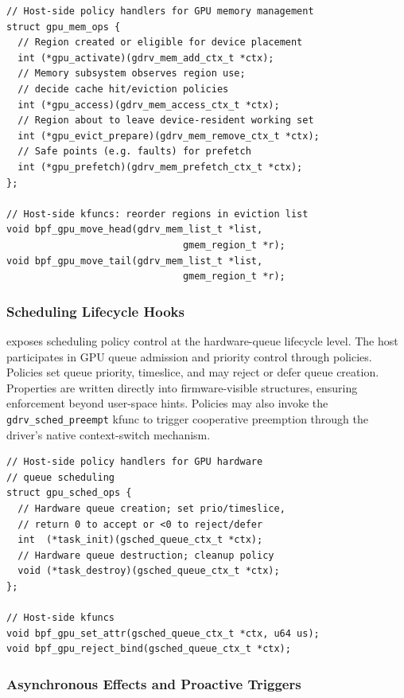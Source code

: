 \begin{lstlisting}
// Host-side policy handlers for GPU memory management
struct gpu_mem_ops {
  // Region created or eligible for device placement
  int (*gpu_activate)(gdrv_mem_add_ctx_t *ctx);
  // Memory subsystem observes region use;
  // decide cache hit/eviction policies
  int (*gpu_access)(gdrv_mem_access_ctx_t *ctx);
  // Region about to leave device-resident working set
  int (*gpu_evict_prepare)(gdrv_mem_remove_ctx_t *ctx);
  // Safe points (e.g. faults) for prefetch
  int (*gpu_prefetch)(gdrv_mem_prefetch_ctx_t *ctx);
};

// Host-side kfuncs: reorder regions in eviction list
void bpf_gpu_move_head(gdrv_mem_list_t *list,
                               gmem_region_t *r);
void bpf_gpu_move_tail(gdrv_mem_list_t *list,
                               gmem_region_t *r);
\end{lstlisting}

\subsubsection{Scheduling Lifecycle Hooks}
\label{sec:design-sched}

\sys exposes scheduling policy control at the hardware-queue lifecycle level. The host participates in GPU queue admission and priority control through policies. Policies set queue priority, timeslice, and may reject or defer queue creation. Properties are written directly into firmware-visible structures, ensuring enforcement beyond user-space hints. Policies may also invoke the \texttt{gdrv\_sched\_preempt} kfunc to trigger cooperative preemption through the driver's native context-switch mechanism.

\begin{lstlisting}
// Host-side policy handlers for GPU hardware
// queue scheduling
struct gpu_sched_ops {
  // Hardware queue creation; set prio/timeslice,
  // return 0 to accept or <0 to reject/defer
  int  (*task_init)(gsched_queue_ctx_t *ctx);
  // Hardware queue destruction; cleanup policy
  void (*task_destroy)(gsched_queue_ctx_t *ctx);
};

// Host-side kfuncs
void bpf_gpu_set_attr(gsched_queue_ctx_t *ctx, u64 us);
void bpf_gpu_reject_bind(gsched_queue_ctx_t *ctx);
\end{lstlisting}

\subsubsection{Asynchronous Effects and Proactive Triggers}

